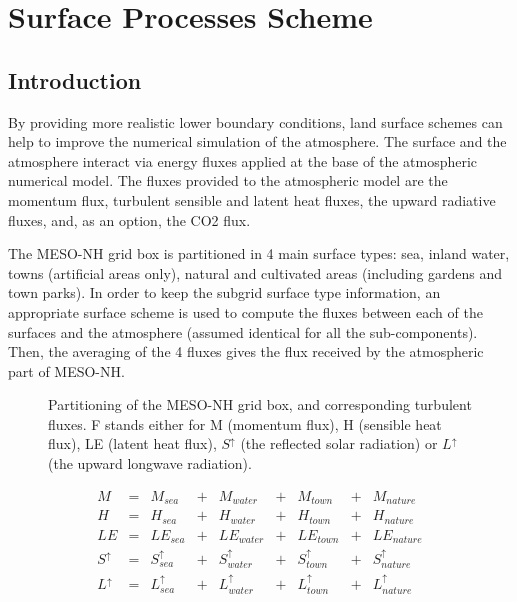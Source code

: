 
\chapter{Surface Processes Scheme}


\section{Introduction}


By providing more realistic
lower boundary conditions,
land surface schemes
can help to improve the numerical simulation
of the atmosphere.
The surface and the atmosphere
interact via energy fluxes applied at the base of the
atmospheric numerical model.
The fluxes provided to the atmospheric model
are the momentum flux, turbulent sensible and latent heat fluxes,
the upward radiative fluxes, and, as an option, the CO2 flux.

The MESO-NH grid box is partitioned in 4 main surface types:
sea, inland water, towns (artificial areas only),
natural and cultivated areas (including gardens and town parks).
In order to keep the subgrid surface type information,
an appropriate surface scheme is used to compute the fluxes
between each of the surfaces and the atmosphere
(assumed identical for all the sub-components).
Then, the averaging of the 4 fluxes gives
the flux received by the atmospheric part of MESO-NH.\\

\begin{figure}[h]
\hspace*{2.cm}
\caption{Partitioning of the MESO-NH grid box, and corresponding turbulent fluxes.
F stands either for M (momentum flux), H (sensible heat flux), LE (latent heat flux),
$S^\uparrow$ (the reflected solar radiation) or $L^\uparrow$ (the
upward longwave radiation).
\label{surf1}}
\end{figure}

\begin{displaymath}
\begin{array}{lclclclcl}
M &= & M_{sea} & + & M_{water} & + & M_{town} & + & M_{nature} \\
H &= & H_{sea} & + & H_{water} & + & H_{town} & + & H_{nature} \\
LE &= & LE_{sea} & + & LE_{water} & + & LE_{town} & + & LE_{nature} \\
S^\uparrow &= & S^\uparrow_{sea} & + & S^\uparrow_{water} & + & S^\uparrow_{town} & + & S^\uparrow_{nature} \\
L^\uparrow &= & L^\uparrow_{sea} & + & L^\uparrow_{water} & + & L^\uparrow_{town} & + & L^\uparrow_{nature} \\
\end{array}
\end{displaymath}

